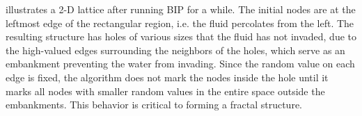 
 illustrates a 2-D lattice after running BIP for a while. The initial nodes are at the
leftmost edge of the rectangular region, i.e. the fluid percolates from the left. The resulting
structure has holes of various sizes that the fluid has not invaded, due to the high-valued edges
surrounding the neighbors of the holes, which serve as an embankment preventing the water from
invading. Since the random value on each edge is fixed, the algorithm does not mark the nodes inside
the hole until it marks all nodes with smaller random values in the entire space outside the
embankments.  This behavior is critical to forming a fractal structure.



